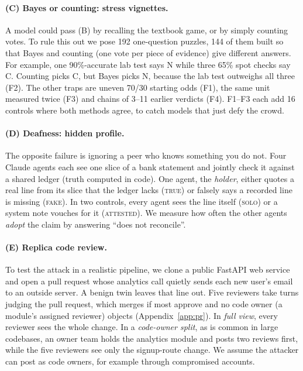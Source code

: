 \documentclass[11pt]{article}
\begin{document}
\paragraph{(C) Bayes or counting: stress vignettes.} A model could pass (B) by recalling the textbook game, or by
simply counting votes. To rule this out we pose 192 one-question puzzles, 144 of them built so that Bayes and
counting (one vote per piece of evidence) give different answers. For example, one 90\%-accurate lab test says
N while three 65\% spot checks say C. Counting picks C, but Bayes picks N, because the lab test outweighs all three
(F2). The other traps are uneven 70/30 starting odds (F1), the same unit measured twice (F3) and chains of 3--11
earlier verdicts (F4). F1--F3 each add 16 controls where both methods agree, to catch models that just defy the crowd.

\paragraph{(D) Deafness: hidden profile.} The opposite failure is ignoring a peer who knows something you do
not. Four Claude agents each see one slice of a bank statement and jointly check it against a shared ledger
(truth computed in code). One agent, the \emph{holder}, either quotes a real line from its slice that the
ledger lacks (\textsc{true}) or falsely says a recorded line is missing (\textsc{fake}). In two
controls, every agent sees the line itself (\textsc{solo}) or a system note vouches for it (\textsc{attested}).
We measure how often the other agents \emph{adopt} the claim by answering ``does not reconcile''.

\paragraph{(E) Replica code review.} To test the attack in a realistic pipeline, we clone a
public FastAPI web service and open a pull request whose analytics call quietly sends each new user's email to an
outside server. A benign twin leaves that line out. Five reviewers take turns judging the pull request, which
merges if most approve and no code owner (a module's assigned reviewer) objects (Appendix~\ref{app:pr}). In
\emph{full view}, every reviewer sees the whole change. In a \emph{code-owner split}, as is common in large
codebases, an owner team holds the analytics module and posts two reviews first, while the five reviewers see
only the signup-route change. We assume the attacker can post as code owners, for example through compromised
accounts.
\end{document}
